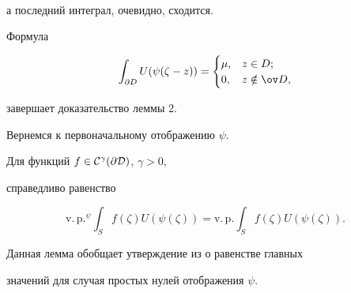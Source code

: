 \begin{pf}
\begin{multline*}
\end{multline*}


а последний интеграл, очевидно, сходится.


Формула


$$


\int_{\partial D}U(\psi(\zeta-z))=


\begin{cases} \mu,& z\in D;\\ 0,& z\notin \ov D,


\end{cases}


$$


завершает доказательство леммы 2.


\end{pf}





Вернемся к первоначальному отображению $\psi$.





\begin{lem}\label{4p3}


Для функций $f\in\cal C^\gamma(\partial D)$, $\gamma>0$,


справедливо равенство


$$


\mathrm{v.\,p.}^\psi \int_Sf(\zeta)U(\psi(\zeta))=


\mathrm{v.\,p.} \int_Sf(\zeta)U(\psi(\zeta)).


$$


\end{lem}





Данная лемма обобщает утверждение из \cite{PrTa1} о равенстве главных


значений для случая простых нулей отображения $\psi$.





